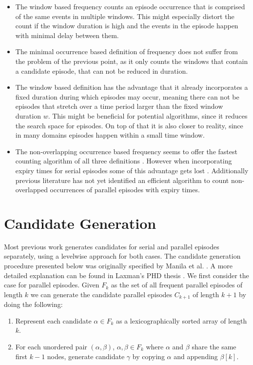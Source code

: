 \begin{itemize}
	\item The window based frequency counts an episode occurrence that is comprised of the same events in multiple windows. This might especially distort the count if the window duration is high and the events in the episode happen with minimal delay between them.
	\item The minimal occurrence based definition of frequency does not suffer from the problem of the previous point, as it only counts the windows that contain a candidate episode, that can not be reduced in duration.
	\item The window based definition has the advantage that it already incorporates a fixed duration during which episodes may occur, meaning there can not be episodes that stretch over a time period larger than the fixed window duration $w$. This might be beneficial for potential algorithms, since it reduces the search space for episodes. On top of that it is also closer to reality, since in many domains episodes happen within a small time window.
	\item The non-overlapping occurrence based frequency seems to offer the fastest counting algorithm of all three definitions \cite{laxman2007fast}. However when incorporating expiry times for serial episodes some of this advantage gets lost \cite{laxman2006discovering}. Additionally previous literature has not yet identified an efficient algorithm to count non-overlapped occurrences of parallel episodes with expiry times. 
\end{itemize}

\section{Candidate Generation}
\label{sec_candidateGen}
Most previous work generates candidates for serial and parallel episodes separately, using a levelwise approach for both cases. The candidate generation procedure presented below was originally specified by Manila et al. \cite{mannila1997discovery}. A more detailed explanation can be found in Laxman's PHD thesis \cite{laxman2006discovering}. \newline
We first consider the case for parallel episodes. Given $F_k$ as the set of all frequent parallel episodes of length $k$ we can generate the candidate parallel episodes $C_{k+1}$ of length $k+1$ by doing the following:

\begin{enumerate}
	\item Represent each candidate $\alpha \in F_k$ as a lexicographically sorted array of length $k$.
	\item For each unordered pair $(\alpha , \beta )$, $\alpha ,\beta \in F_k$ where $\alpha$ and $\beta$ share the same first $k-1$ nodes, generate candidate $\gamma$ by copying $\alpha$ and appending $\beta [k]$.
\end{enumerate}

